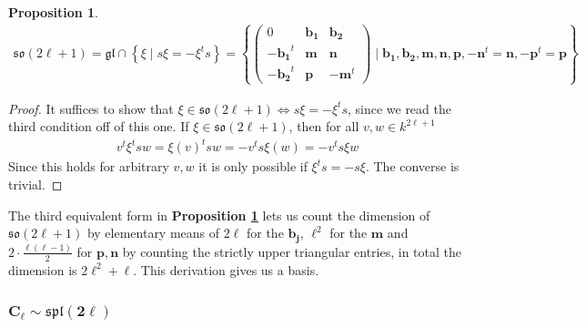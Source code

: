 \documentclass[10.5pt]{article}
\theoremstyle{definition}
\newtheorem{proposition}{Proposition}
\numberwithin{example}{subsection}
\numberwithin{proposition}{subsection}
\numberwithin{pb}{subsection}
\newcommand{\set}[1]{\left\{#1\right\}}
\begin{document}
        \begin{proposition}\label{equivsolodd}
            \begin{align}
                \mathfrak{so}(2\ell + 1) = \mathfrak{gl} \cap \set{\xi \mid s\xi = -\xi^t s} = \set{ \begin{pmatrix}
                0 & \mathbf{b_1} & \mathbf{b_2} \\ -\mathbf{b_1}^t & \mathbf{m} & \mathbf{n} \\ -\mathbf{b_2}^t & \mathbf{p} &-\mathbf{m}^t
                \end{pmatrix} \mid \mathbf{b_1},\mathbf{b_2},\mathbf{m},\mathbf{n},\mathbf{p}, -\mathbf{n}^t = \mathbf{n}, -\mathbf{p}^t = \mathbf{p}}
            \end{align}
        \end{proposition}
        \begin{proof}
            It suffices to show that \(\xi \in \mathfrak{so}(2\ell + 1) \iff s\xi = -\xi^t s\), since we read the third condition off of this one. If \(\xi \in \mathfrak{so}(2\ell + 1)\), then for all \(v,w \in k^{2\ell + 1}\)
            \begin{align}
                v^t\xi^tsw = \xi(v)^{t}sw = -v^ts\xi(w) = -v^ts\xi w
            \end{align}
            Since this holds for arbitrary \(v,w\) it is only possible if \(\xi^t s = -s \xi\). The converse is trivial.
        \end{proof}
        The third equivalent form in \textbf{Proposition \ref{equivsolodd}} lets us count the dimension of \(\mathfrak{so}(2\ell + 1)\) by elementary means of \(2\ell\) for the \(\mathbf{b_j}\), \(\ell^2\) for the \(\mathbf{m}\) and \(2\cdot\frac{\ell(\ell-1)}{2}\) for \(\mathbf{p},\mathbf{n}\) by counting the strictly upper triangular entries, in total the dimension is \(2\ell^2 + \ell\). This derivation gives us a basis.
    \subsubsection{\(\mathbf{C_\ell \sim \mathfrak{spl}(2\ell)}\)}
\end{document}
